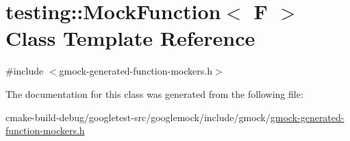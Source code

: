 \hypertarget{classtesting_1_1MockFunction}{}\section{testing\+::Mock\+Function$<$ F $>$ Class Template Reference}
\label{classtesting_1_1MockFunction}


{\ttfamily \#include $<$gmock-\/generated-\/function-\/mockers.\+h$>$}



The documentation for this class was generated from the following file\+:\begin{DoxyCompactItemize}
\item 
cmake-\/build-\/debug/googletest-\/src/googlemock/include/gmock/\mbox{\hyperlink{gmock-generated-function-mockers_8h}{gmock-\/generated-\/function-\/mockers.\+h}}\end{DoxyCompactItemize}

